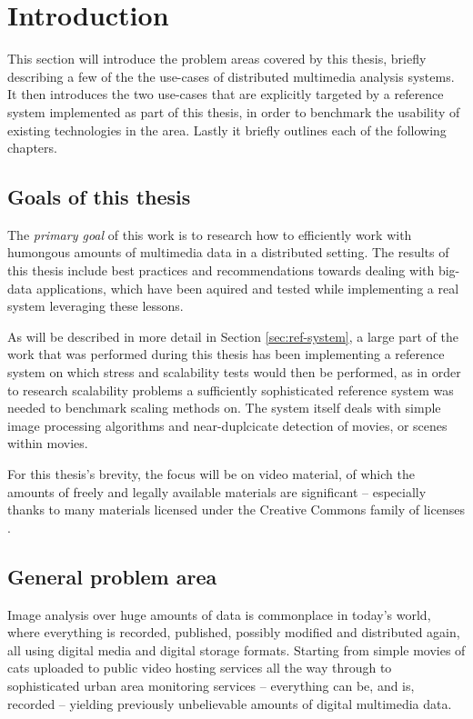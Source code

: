 \chapter{Introduction}
\label{cha:intro}

This section will introduce the problem areas covered by this thesis, briefly describing a few of the the use-cases of distributed multimedia analysis systems. It then introduces the two use-cases that are explicitly targeted by a reference system implemented as part of this thesis, in order to benchmark the usability of existing technologies in the area. Lastly it briefly outlines each of the following chapters.


\section{Goals of this thesis}
The \textit{primary goal} of this work is to research how to efficiently work with humongous amounts of multimedia data in a distributed setting. The results of this thesis include best practices and recommendations towards dealing with big-data applications, which have been aquired and tested while implementing a real system leveraging these lessons. 

As will be described in more detail in Section \ref{sec:ref-system}, a large part of the work that was performed during this thesis has been implementing a reference system on which stress and scalability tests would then be performed, as in order to research scalability problems a sufficiently sophisticated reference system was needed to benchmark scaling methods on. The system itself deals with simple image processing algorithms and near-duplcicate detection of movies, or scenes within movies.

For this thesis's brevity, the focus will be on video material, of which the amounts of freely and legally  available materials are significant -- especially thanks to many materials licensed under the Creative Commons family of licenses \cite{creative-commons}.


\section{General problem area}
Image analysis over huge amounts of data is commonplace in today's world, where everything is recorded, published, possibly modified and distributed again, all using digital media and digital storage formats. Starting from simple movies of cats uploaded to public video hosting services all the way through to sophisticated urban area monitoring services -- everything can be, and is, recorded -- yielding previously unbelievable amounts of digital multimedia data.

